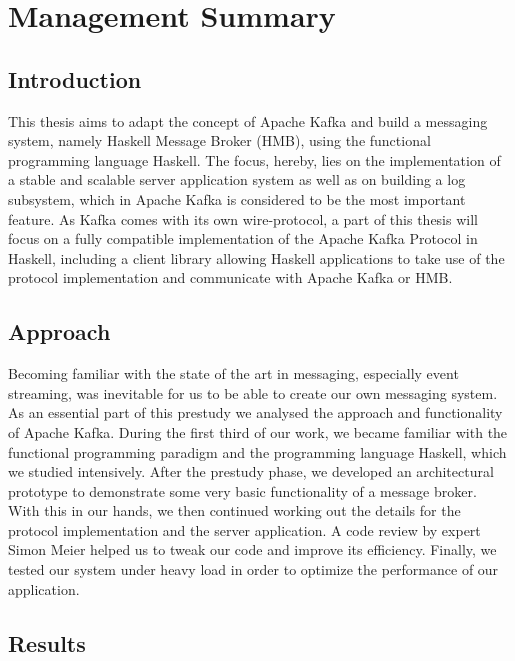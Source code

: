 \chapter{Management Summary}

\section*{Introduction}

This thesis aims to adapt the concept of Apache Kafka and build a messaging
system, namely Haskell Message Broker (HMB), using the functional programming
language Haskell. The focus, hereby, lies on the implementation of a stable
and scalable server application system as well as on building a log
subsystem, which in Apache Kafka is considered to be the most important
feature. As Kafka comes with its own wire-protocol, a part of this thesis
will focus on a fully compatible implementation of the Apache Kafka Protocol
in Haskell, including a client library allowing Haskell applications to take
use of the protocol implementation and communicate with Apache Kafka or HMB. 

\section*{Approach}

Becoming familiar with the state of the art in messaging, especially event
streaming, was inevitable for us to be able to create our own messaging
system. As an essential part of this prestudy we analysed the approach and
functionality of Apache Kafka. During the first third of our work, we became
familiar with the functional programming paradigm and the programming
language Haskell, which we studied intensively. After the prestudy phase, we
developed an architectural prototype to demonstrate some very basic
functionality of a message broker. With this in our hands, we then continued
working out the details for the protocol implementation and the server
application. A code review by expert Simon Meier helped us to tweak our code
and improve its efficiency. Finally, we tested our system under heavy load in
order to optimize the performance of our application.

\section*{Results}

